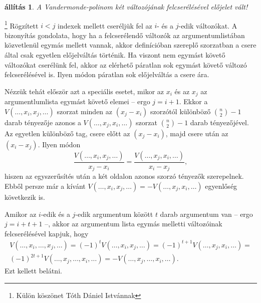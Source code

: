 \documentclass[a4paper, showtrims]{memoir}
\makeatletter
\renewenvironment{proof}[1][\proofname]
    {\par\pushQED{\qed}%
    \normalfont \topsep6\p@\@plus6\p@\relax
    \trivlist
    \item[\hskip\labelsep
        \itshape
    #1\@addpunct{:}]\ignorespaces}
    {\popQED\endtrivlist\@endpefalse}
\theoremstyle{plain}
\newtheorem{proposition}{állítás}[chapter]
\theoremstyle{remark}
\theoremstyle{definition}
\makeatother
\begin{document}
\begin{proposition}
    A Vandermonde-polinom két változójának felcserélésével előjelet vált!
\end{proposition}
\begin{proof}\footnote{Külön köszönet Tóth Dániel Istvánnak}
    Rögzített $i<j$ indexek mellett cseréljük fel az $i$- és a $j$-edik változókat.
    A bizonyítás gondolata, 
    hogy ha a felcserélendő változók az argumentumlistában közvetlenül egymás mellett vannak,
    akkor definícióban szereplő szorzatban a csere által csak egyetlen előjelváltás történik. 
    Ha viszont nem egymást követő változókat cserélünk fel,
    akkor az elérhető páratlan sok egymást követő változó felcserélésével is.
    Ilyen módon páratlan sok előjelváltás a csere ára.
    
    Nézzük tehát először azt a speciális esetet, 
    mikor az $x_i$ és az $x_j$ az argumentlumlista egymást követő elemei -- ergo
    $j=i+1$.
    Ekkor a 
    $V\left( \ldots,x_i,x_j,\ldots \right)$ szorzat minden az $\left( x_j-x_i \right)$ szorzótól
    különböző $\binom{n}{2} -1$ darab tényezője azonos a
    $V\left( \ldots,x_j,x_i,\ldots \right)$ szorzat $\binom{n}{2} -1$ darab tényezőjével.
    Az egyetlen különböző tag, csere előtt az $(x_j-x_i)$, 
    majd csere után az $(x_i-x_j)$.
    Ilyen módon
    \[
        \frac{V\left( \ldots,x_i,x_j,\ldots \right)}{x_j-x_i}
        =
        \frac{V\left( \ldots,x_j,x_i,\ldots \right)}{x_i-x_j},
    \]
    hiszen az egyszerűsítés után a két oldalon azonos szorzó tényezők szerepelnek.
    Ebből persze már a kívánt
    \(
        V\left( \ldots,x_i,x_j,\ldots \right)
        =
        -V\left( \ldots,x_j,x_i,\ldots \right)
    \)
    egyenlőség következik is.

    Amikor az $i$-edik és a $j$-edik argumentum között $t$ darab argumentum van -- ergo $j=i+t+1$ --,
    akkor az argumentum lista egymás melletti változóinak felcserélésével kapjuk, hogy
    \begin{multline*}
        V\left( \ldots,x_i,\ldots,x_j,\ldots \right)
        =
        \left( -1 \right)^t
        V\left( \ldots,x_i,x_j,\ldots \right)
        =
        \left( -1 \right)^{t+1}
        V\left( \ldots,x_j,x_i,\ldots \right)
        =
        \\
        \left( -1 \right)^{2t+1}
        V\left( \ldots,x_j,\ldots,x_i,\ldots \right)
        =
        -
        V\left( \ldots,x_j,\ldots,x_i,\ldots \right).
    \end{multline*}
    Ezt kellett belátni. 
\end{proof}
\end{document}
